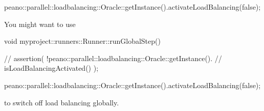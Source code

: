 \begin{code}
peano::parallel::loadbalancing::Oracle::getInstance().activateLoadBalancing(false);
\end{code}


You might want to use
\begin{code}
void myproject::runners::Runner::runGlobalStep() {
  // assertion( !peano::parallel::loadbalancing::Oracle::getInstance().
  // isLoadBalancingActivated() );

  peano::parallel::loadbalancing::Oracle::getInstance().activateLoadBalancing(false);
}
\end{code}

\noindent
to switch off load balancing globally.


